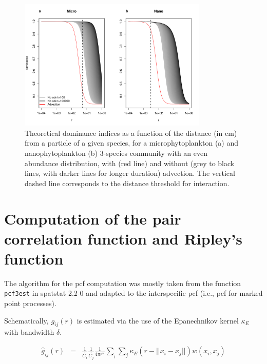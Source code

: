 \documentclass[english]{article}
\begin{document}
\begin{figure}[H]
\begin{centering}
\includegraphics[width=0.8\textwidth]{../code/figure/theory_dominance}
\par\end{centering}
\caption{Theoretical dominance indices as a function of the distance (in cm)
from a particle of a given species, for a microphytoplankton (a) and
nanophytoplankton (b) 3-species community with an even abundance distribution,
with (red line) and without (grey to black lines, with darker lines
for longer duration) advection. The vertical dashed line corresponds
to the distance threshold for interaction. \label{fig:Theoretical-dom}}

\end{figure}


\section{Computation of the pair correlation function and Ripley's function}

The algorithm for the pcf computation was mostly taken from the function
\verb|pcf3est| in spatstat 2.2-0 \citep{baddeley_spatstat} and adapted
to the interspecific pcf (i.e., pcf for marked point processes).

Schematically, $g_{ij}(r)$ is estimated via the use of the Epanechnikov
kernel $\kappa_{E}$ with bandwidth $\delta$.

\begin{equation}
\begin{array}{ccc}
\hat{g}_{ij}(r) & = & \frac{1}{\hat{C_{i}}}\frac{1}{\hat{C_{j}}}\frac{1}{4\pi r^{2}}\sum_{_{i}}\sum_{j}\kappa_{E}(r-||x_{i}-x_{j}||)w(x_{i},x_{j})\end{array}\label{eq:pcf_estimate}
\end{equation}
\end{document}
